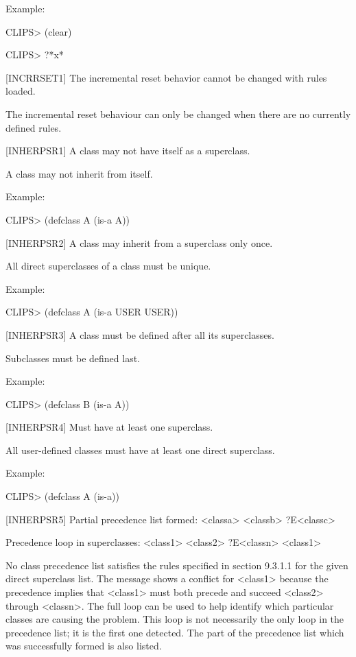 \documentclass[letterpaper,10pt,english]{sphinxmanual}
\begin{document}
Example:

CLIPS\textgreater{} (clear)

CLIPS\textgreater{} ?*x*

{[}INCRRSET1{]} The incremental reset behavior cannot be changed with rules
loaded.

The incremental reset behaviour can only be changed when there are no
currently defined rules.

{[}INHERPSR1{]} A class may not have itself as a superclass.

A class may not inherit from itself.

Example:

CLIPS\textgreater{} (defclass A (is-a A))

{[}INHERPSR2{]} A class may inherit from a superclass only once.

All direct superclasses of a class must be unique.

Example:

CLIPS\textgreater{} (defclass A (is-a USER USER))

{[}INHERPSR3{]} A class must be defined after all its superclasses.

Subclasses must be defined last.

Example:

CLIPS\textgreater{} (defclass B (is-a A))

{[}INHERPSR4{]} Must have at least one superclass.

All user-defined classes must have at least one direct superclass.

Example:

CLIPS\textgreater{} (defclass A (is-a))

{[}INHERPSR5{]} Partial precedence list formed: \textless{}classa\textgreater{} \textless{}classb\textgreater{} ?E\textless{}classc\textgreater{}

Precedence loop in superclasses: \textless{}class1\textgreater{} \textless{}class2\textgreater{} ?E\textless{}classn\textgreater{} \textless{}class1\textgreater{}

No class precedence list satisfies the rules specified in section
9.3.1.1 for the given direct superclass list. The message shows a
conflict for \textless{}class1\textgreater{} because the precedence implies that \textless{}class1\textgreater{} must
both precede and succeed \textless{}class2\textgreater{} through \textless{}classn\textgreater{}. The full loop can be
used to help identify which particular classes are causing the problem.
This loop is not necessarily the only loop in the precedence list; it is
the first one detected. The part of the precedence list which was
successfully formed is also listed.
\end{document}
